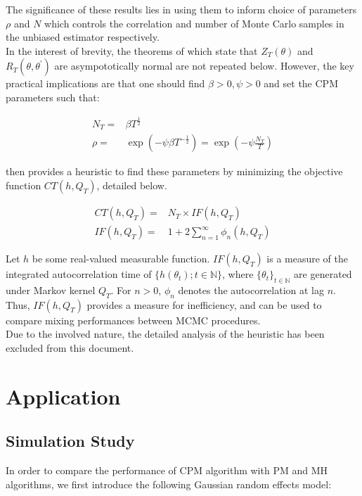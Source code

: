 \documentclass{article}
\begin{document}
The significance of these results lies in using them to inform choice of parameters $\rho$ and $N$ which controls the correlation and number of Monte Carlo samples in the unbiased estimator respectively. \\

In the interest of brevity, the theorems of \cite{cpmmDeligiannidis2015} which state that $Z_T(\theta)$ and $R_T(\theta, \theta^\prime)$ are asympototically normal are not repeated below. However, the key practical implications are that one should find $\beta>0, \psi>0$ and set the CPM parameters such that:

\begin{align}
N_T =& \beta T ^{\frac{1}{2}} \label{eq:n}\\
\rho =& \exp(-\psi \beta T ^ {-\frac{1}{2}}) = \exp(-\psi \frac{N_T}{T}) \label{eq:rho}
\end{align}

\cite{cpmmDeligiannidis2015} then provides a heuristic to find these parameters by minimizing the objective function $CT(h, Q_T)$, detailed below.

\begin{align}
CT(h, Q_T) =& N_T \times IF(h, Q_T) \\
IF(h, Q_T) =& 1 + 2 \sum_{n=1}^{\infty} \phi_n (h, Q_T) \label{eq:IF}
\end{align}


Let $h$ be some real-valued measurable function. $IF(h, Q_T)$ is a measure of the integrated autocorrelation time of $\{h(\theta_t) ; t \in \mathbb{N}\}$, where $\{\theta_t\}_{t \in \mathbb{N}}$ are generated under Markov kernel $Q_T$. For $n>0$, $\phi_n$ denotes the autocorrelation at lag $n$. Thus, $IF(h, Q_T)$ provides a measure for inefficiency, and can be used to compare mixing performances between MCMC procedures. \\

Due to the involved nature, the detailed analysis of the heuristic has been excluded from this document.


  \section{Application}

  \subsection{Simulation Study}
  In order to compare the performance of CPM algorithm with PM and MH algorithms, we first introduce the following Gaussian random effects model:
\end{document}
